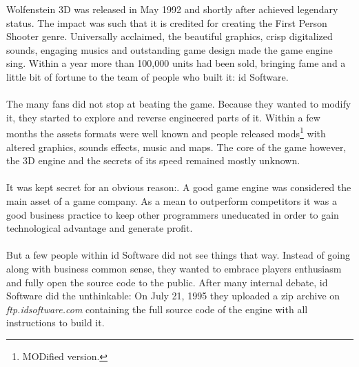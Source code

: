 Wolfenstein 3D was released in May 1992 and shortly after achieved legendary status. The impact was such that it is credited for creating the First Person Shooter genre. Universally acclaimed, the beautiful graphics, crisp digitalized sounds, engaging musics and outstanding game design made the game engine sing. Within a year more than 100,000 units had been sold, bringing fame and a little bit of fortune to the team of people who built it: id Software.\\
\\
The many fans did not stop at beating the game. Because they wanted to modify it, they started to explore and reverse engineered parts of it. Within a few months the assets formats were well known and people released mods\footnote{MODified version.} with altered graphics, sounds effects, music and maps. The core of the game however, the 3D engine and the secrets of its speed remained mostly unknown.\\
\\
It was kept secret for an obvious reason:. A good game engine was considered the main asset of a game company. As a mean to outperform competitors it was a good business practice to keep other programmers  uneducated in order to gain technological advantage and generate profit.\\
\\
But a few people within id Software did not see things that way. Instead of going along with business common sense, they wanted to embrace players enthusiasm and fully open the source code to the public. After many internal debate, id Software did the unthinkable: On July 21, 1995 they uploaded a zip archive on \emph{ftp.idsoftware.com} containing the full source code of the engine with all instructions to build it.\\

